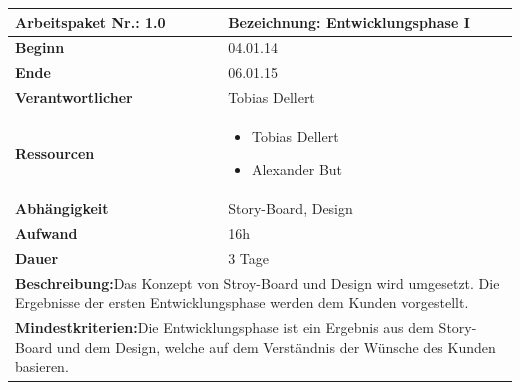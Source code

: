 \documentclass[fontsize=12pt,paper=a4,twoside]{scrartcl}
\begin{document}
\begin{tabular}{|p{5.3cm}|p{9.7cm}|}\hline
	\textbf{Arbeitspaket Nr.:} 1.0 & \textbf{Bezeichnung:} Entwicklungsphase I \\ \hline \hline
	\textbf{Beginn} & 04.01.14\\ \hline
	\textbf{Ende} & 06.01.15\\ \hline
	\textbf{Verantwortlicher} & Tobias Dellert \\ \hline
	\textbf{Ressourcen} & \begin{itemize}
		\item Tobias Dellert
		\item Alexander But
	\end{itemize}    \\ \hline
	\textbf{Abhängigkeit} & Story-Board, Design\\ \hline
	\textbf{Aufwand} & 16h\\ \hline
	\textbf{Dauer} & 3 Tage\\ \hline
	\multicolumn{2}{|p{15cm}|}{\textbf{Beschreibung:}\newline Das Konzept von Stroy-Board und Design wird umgesetzt. Die Ergebnisse der ersten Entwicklungsphase werden dem Kunden vorgestellt.  }\\ \hline
	\multicolumn{2}{|p{15cm}|}{\textbf{Mindestkriterien:}\newline Die Entwicklungsphase ist ein Ergebnis aus dem Story-Board und dem Design, welche auf dem Verständnis der Wünsche des Kunden basieren.}\\ \hline
	
\end{tabular}
\begin{verbatim} 

\end{verbatim}
\end{document}
